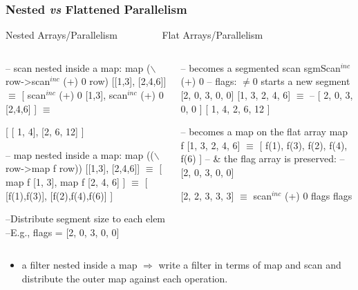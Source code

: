 \documentclass{beamer}
\renewcommand{\emph}[1]{\textcolor{structure}{#1}}
\newcommand{\emp}[1]{\textcolor{DikuRed}{ #1}}
\newcommand{\mymath}[1]{$ #1 $}
\newcommand{\myindu}[1]{^{#1}}
\begin{document}
\begin{frame}[fragile,t]
  \frametitle{Nested {\it vs} Flattened Parallelism}

\begin{block}{Nested Arrays/Parallelism{\tt~~~~~~~~~}Flat Arrays/Parallelism}
\begin{columns}
\begin{colorcode}[fontsize=\scriptsize]
\alert{-- scan nested inside a map:}
map (\mymath{\backslash}row->scan\mymath{\myindu{inc}} (+) 0 row) 
    \emp{[[1,3], [2,4,6]]} \mymath{\equiv}
[ scan\mymath{\myindu{inc}} (+) 0 [1,3],
  scan\mymath{\myindu{inc}} (+) 0 [2,4,6] ] \mymath{\equiv}

\emp{[ [ 1, 4], [2, 6, 12] ]}

\alert{-- map nested inside a map:}
map ((\mymath{\backslash}row->map f row)) 
    \emp{[[1,3], [2,4,6]]} \mymath{\equiv}
[ map f [1, 3],  map f [2, 4, 6] ] \mymath{\equiv}
\emp{[ [f(1),f(3)], [f(2),f(4),f(6)] ]}

--\alert{Distribute segment size to each elem}
--E.g., flags = [2, 0, 3, 0, 0]
\end{colorcode}
\begin{colorcode}[fontsize=\scriptsize]
-- \emph{becomes a segmented scan}
sgmScan\mymath{\myindu{inc}} (+) 0
-- flags: \mymath{\neq}0 starts a new segment
    \emph{[2, 0, 3, 0, 0]} 
    \emph{[1, 3, 2, 4, 6]} \mymath{\equiv}
--  \emph{[ 2, 0, 3, 0, 0  ]} 
    \emph{[ 1, 4, 2, 6, 12 ]}

-- \emph{becomes a map on the flat array}
map f \emph{[1, 3, 2, 4, 6]} \mymath{\equiv}
\emph{[ f(1), f(3), f(2), f(4), f(6) ]}
-- \& the flag array is preserved: 
-- [2, 0, 3, 0, 0]

\emph{[2, 2, 3, 3, 3] \mymath{\equiv}}\pause
    scan\mymath{\myindu{inc}} (+) 0 flags flags
\end{colorcode}
\end{columns}
\end{block}

\begin{itemize}
    \item a filter nested inside a map $\Rightarrow$
            write a filter in terms of map and scan and 
            distribute the outer map against each operation.
\end  {itemize}

\end{frame}
\end{document}
